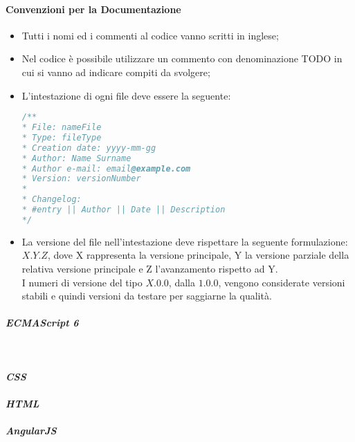 \paragraph{Convenzioni per la Documentazione}
\begin{itemize}	
	\item Tutti i nomi ed i commenti al codice vanno scritti in inglese;
	\item Nel codice è possibile utilizzare un commento con denominazione TODO in cui si vanno ad indicare compiti da svolgere;
	\item L'intestazione di ogni file deve essere la seguente:
	\begin{lstlisting}[language=JavaScript]
/**
* File: nameFile
* Type: fileType
* Creation date: yyyy-mm-gg
* Author: Name Surname
* Author e-mail: email@example.com
* Version: versionNumber 
*
* Changelog:
* #entry || Author || Date || Description
*/
	\end{lstlisting}
	\item La versione del file nell'intestazione deve rispettare la seguente formulazione: $X.Y.Z$, dove X rappresenta la versione principale, Y la versione parziale della relativa versione principale e Z l'avanzamento rispetto ad Y.\\ I numeri di versione del tipo $X.0.0$, dalla $1.0.0$, vengono considerate versioni stabili e quindi versioni da testare per saggiarne la qualità.
\end{itemize}
\paragraph{\textit{ECMAScript 6}}\label{EcmaScript6} \-\\


\paragraph{\textit{CSS}}


\paragraph{\textit{HTML}}


\paragraph{\textit{AngularJS}} \label{angularjs} \-\\



